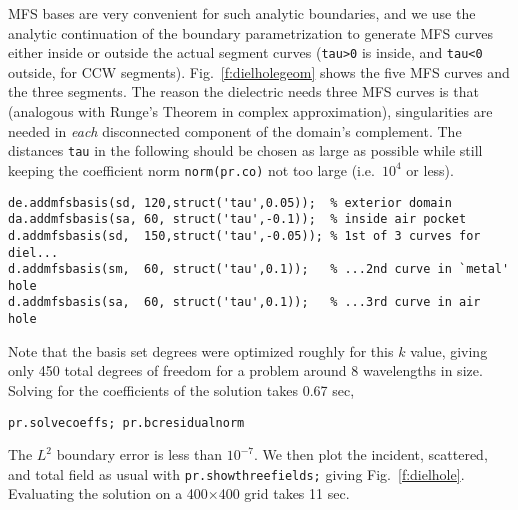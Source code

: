 MFS bases are very convenient for such analytic boundaries, and we use the
analytic continuation of the boundary parametrization to generate MFS curves
either inside or outside the actual segment curves
({\tt tau>0} is inside, and {\tt tau<0} outside, for CCW segments).
Fig.~\ref{f:dielholegeom} shows the five MFS curves and the three segments.
The reason the dielectric needs three MFS curves is that (analogous
with Runge's Theorem in complex approximation), singularities are needed in
{\em each} disconnected component of the domain's complement.
The distances {\tt tau} in the following should be chosen as large as possible
while still keeping the coefficient norm {\tt norm(pr.co)} not too large
(i.e.\ $10^4$ or less).
\begin{verbatim}
de.addmfsbasis(sd, 120,struct('tau',0.05));  % exterior domain
da.addmfsbasis(sa, 60, struct('tau',-0.1));  % inside air pocket
d.addmfsbasis(sd,  150,struct('tau',-0.05)); % 1st of 3 curves for diel...
d.addmfsbasis(sm,  60, struct('tau',0.1));   % ...2nd curve in `metal' hole
d.addmfsbasis(sa,  60, struct('tau',0.1));   % ...3rd curve in air hole
\end{verbatim}
Note that the basis set degrees were optimized roughly for this $k$ value,
giving only 450 total degrees of freedom for a problem around
8 wavelengths in size.
Solving for the coefficients of the solution takes 0.67 sec,
\begin{verbatim}
pr.solvecoeffs; pr.bcresidualnorm
\end{verbatim}
The $L^2$ boundary error is less than $10^{-7}$.
We then plot the incident, scattered, and total field as usual with
{\tt pr.showthreefields;} giving Fig.~\ref{f:dielhole}.
Evaluating the solution on a 400$\times$400 grid takes 11 sec.

